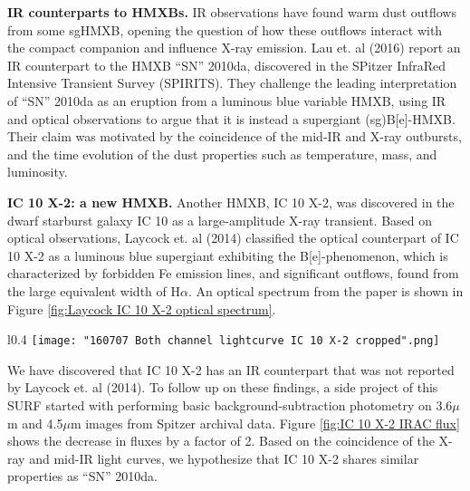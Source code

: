\documentclass{article}
\begin{document}
\noindent\textbf{IR counterparts to HMXBs.}
IR observations have found warm dust outflows from some sgHMXB, opening the question of how these outflows interact with the compact companion and influence X-ray emission. Lau et. al (2016) report an IR counterpart to the HMXB ``SN'' 2010da, discovered in the SPitzer InfraRed Intensive Transient Survey (SPIRITS). They challenge the leading interpretation of ``SN'' 2010da as an eruption from a luminous blue variable HMXB, using IR and optical observations to argue that it is instead a supergiant (sg)B[e]-HMXB. Their claim was motivated by the coincidence of the mid-IR and X-ray outbursts, and the time evolution of the dust properties such as temperature, mass, and luminosity.

\noindent\textbf{IC 10 X-2: a new HMXB.} Another HMXB, IC 10 X-2, was discovered in the dwarf starburst galaxy IC 10 as a large-amplitude X-ray transient. Based on optical observations, Laycock et. al (2014) classified the optical counterpart of IC 10 X-2 as a luminous blue supergiant exhibiting the B[e]-phenomenon, which is characterized by forbidden Fe emission lines, and significant outflows, found from the large equivalent width of H$\alpha$. An optical spectrum from the paper is shown in Figure \ref{fig:Laycock IC 10 X-2 optical spectrum}. 
\begin{wrapfigure}[15]{l}{0.4\textwidth}
  \vspace{-3ex}
  \texttt{[image: "160707 Both channel lightcurve IC 10 X-2 cropped".png]}
  \vspace{-5ex}
  \caption{IRAC Ch 1 $3.6\mu m$ and Ch 2 $4.5 \mu m$ background-corrected flux (mJy) of IC 10 X-2. The fluxes decreased by half shortly before the 2010 X-ray outburst (dashed line).}
  \label{fig:IC 10 X-2 IRAC flux}
\end{wrapfigure}


We have discovered that IC 10 X-2 has an IR counterpart that was not reported by Laycock et. al (2014). To follow up on these findings, a side project of this SURF started with performing basic background-subtraction photometry on 3.6$\mu$m and 4.5$\mu$m images from Spitzer archival data. Figure \ref{fig:IC 10 X-2 IRAC flux} shows the decrease in fluxes by a factor of 2. Based on the coincidence of the X-ray and mid-IR light curves, we hypothesize that IC 10 X-2 shares similar properties as ``SN'' 2010da.
\end{document}
